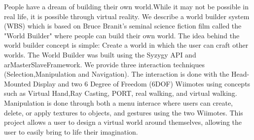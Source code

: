 People have a dream of building their own world.While it may not be possible in real life, it is possible through virtual reality.
We describe a world builder system (WBS) which is based on Bruce Branit's seminal science fiction film called the "World Builder" where people can build their own world.
The idea behind the world builder concept is simple: Create a world in which the user can craft other worlds.
The World Builder was built using the Syzygy API and arMasterSlaveFramework.
We provide three interaction techniques (Selection,Manipulation and Navigation).
The interaction is done with the Head-Mounted Display and two 6 Degree of Freedom (6DOF) Wiimotes using concepts such as Virtual Hand,Ray Casting, PORT, real walking, and virtual walking.
Manipulation is done through both a menu interace where users can create, delete, or apply textures to objects, and gestures using the two Wiimotes.
This project allows a user to design a virtual world around themselves, allowing the user to easily bring to life their imagination.
